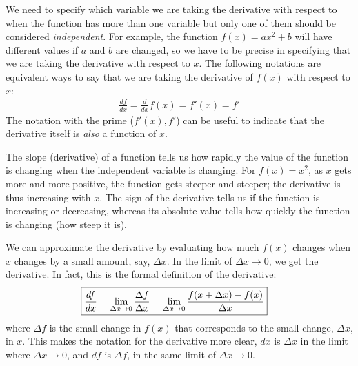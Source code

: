We need to specify which variable we are taking the derivative with respect to when the function has more than one variable but only one of them should be considered \textit{independent}. For example, the function $f(x)=ax^2+b$ will have different values if $a$ and $b$ are changed, so we have to be precise in specifying that we are taking the derivative with respect to $x$. The following notations are equivalent ways to say that we are taking the derivative of $f(x)$ with respect to $x$:
\begin{align*}
\frac{df}{dx}=\frac{d}{dx} f(x) = f'(x) = f'
\end{align*}
The notation with the prime ($f'(x),f'$) can be useful to indicate that the derivative itself is \textit{also} a function of $x$. 

The slope (derivative) of a function tells us how rapidly the value of the function is changing when the independent variable is changing. For $f(x)=x^2$, as $x$ gets more and more positive, the function gets steeper and steeper; the derivative is thus increasing with $x$. The sign of the derivative tells us if the function is increasing or decreasing, whereas its absolute value tells how quickly the function is changing (how steep it is).

We can approximate the derivative by evaluating how much $f(x)$ changes when $x$ changes by a small amount, say, $\Delta x$. In the limit of $\Delta x\to 0$, we get the derivative. In fact, this is the formal definition of the derivative: 
\begin{align}
\label{eqn:Calculus:derdef}
\Aboxed{\frac{df}{dx}=\lim_{\Delta x\to 0}\frac{\Delta f}{\Delta x} =\lim_{\Delta x\to 0}\frac{f(x+\Delta x)-f(x)}{\Delta x} }
\end{align}
where $\Delta f$ is the small change in $f(x)$ that corresponds to the small change, $\Delta x$, in $x$. This makes the notation for the derivative more clear, $dx$ is $\Delta x$ in the limit where $\Delta x\to0$, and $df$ is $\Delta f$, in the same limit of $\Delta x\to 0$.

